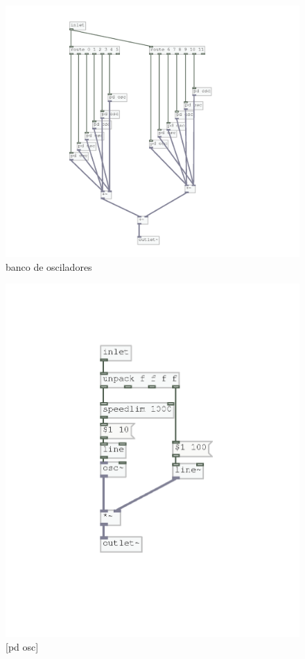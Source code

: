 \documentclass{ppgmus}
\begin{document}
\begin{figure}
\includegraphics[scale=.7]{banco-osc}
\caption{banco de osciladores}
\label{bancoosc}
\end{figure}

\begin{figure}
\includegraphics[scale=.7]{osc-base}
\caption{[pd osc]}
\label{pdosc}
\end{figure}
\end{document}
